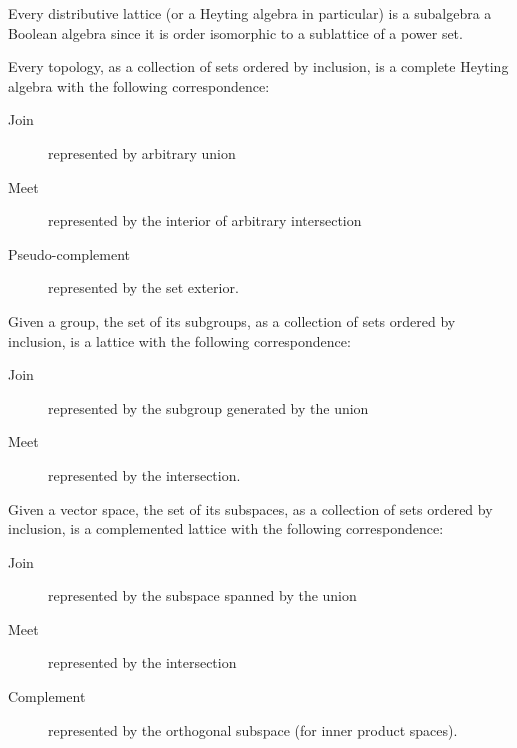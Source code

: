 \documentclass{article}
\begin{document}
\begin{prop}
	Every distributive lattice (or a Heyting algebra in particular) is a subalgebra a Boolean algebra since it is order isomorphic to a sublattice of a power set.
\end{prop}

\begin{prop}[Topology]
	Every topology, as a collection of sets ordered by inclusion, is a complete Heyting algebra with the following correspondence:
	\begin{description}
		\item[Join] represented by arbitrary union
		\item[Meet] represented by the interior of arbitrary intersection
		\item[Pseudo-complement] represented by the set exterior.
	\end{description}
\end{prop}

\begin{prop}
	Given a group, the set of its subgroups, as a collection of sets ordered by inclusion, is a lattice with the following correspondence:
	\begin{description}
		\item[Join] represented by the subgroup generated by the union
		\item[Meet] represented by the intersection.
	\end{description}
\end{prop}

\begin{prop}
	Given a vector space, the set of its subspaces, as a collection of sets ordered by inclusion, is a complemented lattice with the following correspondence:
	\begin{description}
		\item[Join] represented by the subspace spanned by the union
		\item[Meet] represented by the intersection
		\item[Complement] represented by the orthogonal subspace (for inner product spaces).
	\end{description}
\end{prop}
\end{document}
